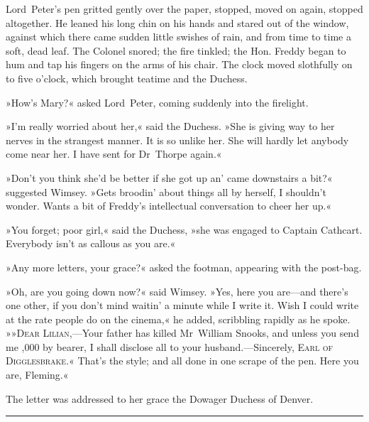 Lord~Peter's pen gritted gently over the paper, stopped, moved on again, stopped altogether. He leaned his long chin on his hands and stared out of the window, against which there came sudden little swishes of rain, and from time to time a soft, dead leaf. The Colonel snored; the fire tinkled; the Hon. Freddy began to hum and tap his fingers on the arms of his chair. The clock moved slothfully on to five o'clock, which brought teatime and the Duchess.

»How's Mary?« asked Lord~Peter, coming suddenly into the firelight.

»I'm really worried about her,« said the Duchess. »She is giving way to her nerves in the strangest manner. It is so unlike her. She will hardly let anybody come near her. I have sent for Dr~Thorpe again.«

»Don't you think she'd be better if she got up an' came downstairs a bit?« suggested Wimsey. »Gets broodin' about things all by herself, I shouldn't wonder. Wants a bit of Freddy's intellectual conversation to cheer her up.«

»You forget; poor girl,« said the Duchess, »she was engaged to Captain Cathcart. Everybody isn't as callous as you are.«

»Any more letters, your grace?« asked the footman, appearing with the post-bag.

»Oh, are you going down now?« said Wimsey. »Yes, here you are—and there's one other, if you don't mind waitin' a minute while I write it. Wish I could write at the rate people do on the cinema,« he added, scribbling rapidly as he spoke. »»\textsc{Dear Lilian},—Your father has killed Mr~William Snooks, and unless you send me ,000 by bearer, I shall disclose all to your husband.—Sincerely, \textsc{Earl of Digglesbrake}.« That's the style; and all done in one scrape of the pen. Here you are, Fleming.«

The letter was addressed to her grace the Dowager Duchess of Denver.


\noindent\hfil\rule{0.5\textwidth}{.4pt}\hfil

\begin{a4}
	\clearpage
\end{a4}

